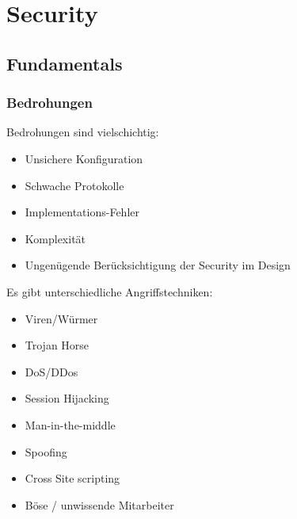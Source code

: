 \chapter{Security}

\section{Fundamentals}

\subsection{Bedrohungen}
Bedrohungen sind vielschichtig:
\begin{multicols}{2}
\begin{itemize}
	\item Unsichere Konfiguration	
	\item Schwache Protokolle
	\item Implementations-Fehler
	\item Komplexität
	\item Ungenügende Berücksichtigung der Security im Design
\end{itemize}
\end{multicols}

\noindent Es gibt unterschiedliche Angriffstechniken:
\begin{multicols}{2}
\begin{itemize}
	\item Viren/Würmer
	\item Trojan Horse
	\item DoS/DDos
	\item Session Hijacking
	\item Man-in-the-middle
	\item Spoofing
	\item Cross Site scripting
	\item Böse / unwissende Mitarbeiter
\end{itemize}
\end{multicols}

